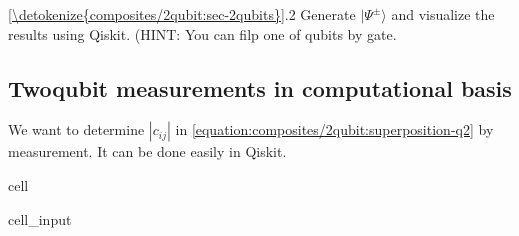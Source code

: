\documentclass[letterpaper,10pt,english]{jupyterBook}
\begin{document}
\sphinxAtStartPar
{}  \hyperref[\detokenize{composites/2qubit:sec-2qubits}]{\ref{\detokenize{composites/2qubit:sec-2qubits}}}.2  Generate \(|\Psi^{\pm}\rangle\) and visualize the results using Qiskit. (HINT: You can filp one of qubits by  gate.


\subsection{Two\sphinxhyphen{}qubit measurements in computational basis}
\label{\detokenize{composites/2qubit:two-qubit-measurements-in-computational-basis}}
\sphinxAtStartPar
We want to determine \(|c_{ij}|\) in  \eqref{equation:composites/2qubit:superposition-q2} by measurement.  It can be done easily in Qiskit.

\begin{sphinxuseclass}{cell}\begin{sphinxVerbatimInput}

\begin{sphinxuseclass}{cell_input}
\begin{sphinxVerbatim}[commandchars=\\\{\}]
   
   




\end{sphinxVerbatim}
\end{sphinxuseclass}
\end{sphinxVerbatimInput}
\end{sphinxuseclass}
\end{document}
